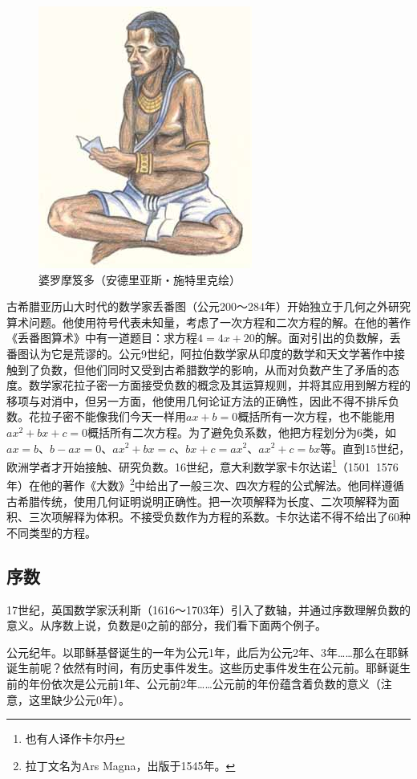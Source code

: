 \documentclass[b5paper]{ctexart}
\begin{document}
\begin{figure}[htbp]
 \centering
 \includegraphics[scale=0.3]{img/Brahmagupta}
 \caption{婆罗摩笈多（安德里亚斯・施特里克绘）}
 \label{fig:yinyang}
\end{figure}

古希腊亚历山大时代的数学家丢番图（公元200～284年）开始独立于几何之外研究算术问题。他使用符号代表未知量，考虑了一次方程和二次方程的解。在他的著作《丢番图算术》中有一道题目：求方程$4 = 4x + 20$的解。面对引出的负数解，丢番图认为它是荒谬的。公元9世纪，阿拉伯数学家从印度的数学和天文学著作中接触到了负数，但他们同时又受到古希腊数学的影响，从而对负数产生了矛盾的态度。数学家花拉子密一方面接受负数的概念及其运算规则，并将其应用到解方程的移项与对消中，但另一方面，他使用几何论证方法的正确性，因此不得不排斥负数。花拉子密不能像我们今天一样用$ax + b = 0$概括所有一次方程，也不能能用$ax^2 + bx + c = 0$概括所有二次方程。为了避免负系数，他把方程划分为6类，如$ax = b$、$b - ax = 0$、$ax^2 + bx = c$、$bx + c = ax^2$、$ax^2 + c = bx$等。直到15世纪，欧洲学者才开始接触、研究负数。16世纪，意大利数学家卡尔达诺\footnote{也有人译作卡尔丹}（1501~1576年）在他的著作《大数》\footnote{拉丁文名为Ars Magna，出版于1545年。}中给出了一般三次、四次方程的公式解法。他同样遵循古希腊传统，使用几何证明说明正确性。把一次项解释为长度、二次项解释为面积、三次项解释为体积。不接受负数作为方程的系数。卡尔达诺不得不给出了60种不同类型的方程。

\subsection{序数}
17世纪，英国数学家沃利斯（1616～1703年）引入了数轴，并通过序数理解负数的意义。从序数上说，负数是0之前的部分，我们看下面两个例子。

\begin{example}
公元纪年。以耶稣基督诞生的一年为公元1年，此后为公元2年、3年……那么在耶稣诞生前呢？依然有时间，有历史事件发生。这些历史事件发生在公元前。耶稣诞生前的年份依次是公元前1年、公元前2年……公元前的年份蕴含着负数的意义（注意，这里缺少公元0年）。
\end{example}
\end{document}
